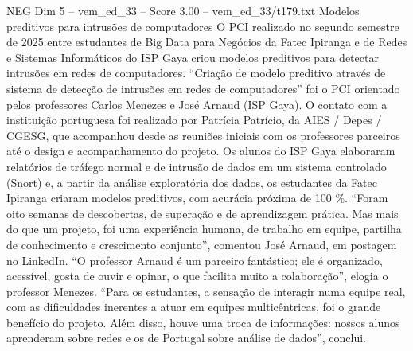 \begin{textsample}{NEG Dim 5 – vem\_ed\_33 – Score 3.00 – vem\_ed\_33/t179.txt}  \label{ex:f5_neg_070}
Modelos preditivos para intrusões de computadores O PCI realizado no segundo semestre de 2025 entre estudantes de Big Data para Negócios da Fatec Ipiranga e de Redes e Sistemas Informáticos do ISP Gaya criou modelos preditivos para detectar intrusões em redes de computadores. “Criação de modelo preditivo através de sistema de detecção de intrusões em redes de computadores” foi o PCI orientado pelos professores Carlos Menezes e José Arnaud (ISP Gaya).
O contato com a instituição portuguesa foi realizado por Patrícia Patrício, da AIES / Depes / CGESG, que acompanhou desde as reuniões iniciais com os professores parceiros até o design e acompanhamento do projeto.
Os alunos do ISP Gaya elaboraram relatórios de tráfego normal e de intrusão de dados em um sistema controlado (Snort) e, a partir da análise exploratória dos dados, os estudantes da Fatec Ipiranga criaram modelos preditivos, com acurácia próxima de 100 \%. “Foram oito semanas de descobertas, de superação e de aprendizagem prática.
Mas mais do que um projeto, foi uma experiência humana, de trabalho em equipe, partilha de conhecimento e crescimento conjunto”, comentou José Arnaud, em postagem no LinkedIn. “O professor Arnaud é um parceiro fantástico; ele é organizado, acessível, gosta de ouvir e opinar, o que facilita muito a colaboração”, elogia o professor Menezes. “Para os estudantes, a sensação de interagir numa equipe real, com as dificuldades inerentes a atuar em equipes multicêntricas, foi o grande benefício do projeto.
Além disso, houve uma troca de informações: nossos alunos aprenderam sobre redes e os de Portugal sobre análise de dados”, conclui.

\end{textsample}
